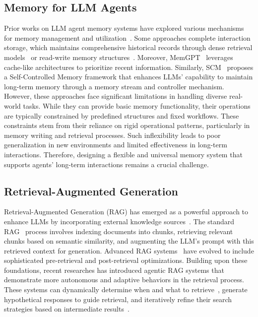 \documentclass{article}
\begin{document}
\subsection{Memory for LLM Agents}
Prior works on LLM agent memory systems have explored various mechanisms for memory management and utilization~\cite{aios,agentlite,mem0,memorybank}. Some approaches complete interaction storage, which maintains comprehensive historical records through dense retrieval models~\cite{memorybank} or read-write memory structures~\cite{modarressi2023ret}. Moreover, MemGPT~\cite{memgpt} leverages cache-like architectures to prioritize recent information. Similarly, SCM~\cite{wang2023enhancing} proposes a Self-Controlled Memory framework that enhances LLMs' capability to maintain long-term memory through a memory stream and controller mechanism.
However, these approaches face significant limitations in handling diverse real-world tasks. While they can provide basic memory functionality, their operations are typically constrained by predefined structures and fixed workflows. These constraints stem from their reliance on rigid operational patterns, particularly in memory writing and retrieval processes. Such inflexibility leads to poor generalization in new environments and limited effectiveness in long-term interactions. Therefore, designing a flexible and universal memory system that supports agents' long-term interactions remains a crucial challenge.


\subsection{Retrieval-Augmented Generation}
Retrieval-Augmented Generation (RAG) has emerged as a powerful approach to enhance LLMs by incorporating external knowledge sources~\cite{rag1,borgeaud2022improving,gao2023retrieval}. The standard RAG~\cite{yu2023chain,wang2023learning} process involves indexing documents into chunks, retrieving relevant chunks based on semantic similarity, and augmenting the LLM's prompt with this retrieved context for generation. Advanced RAG systems~\cite{lin2023ra,ilin2023advanced} have evolved to include sophisticated pre-retrieval and post-retrieval optimizations.
Building upon these foundations, recent researches has introduced agentic RAG systems that demonstrate more autonomous and adaptive behaviors in the retrieval process. These systems can dynamically determine when and what to retrieve~\cite{asai2023self,jiang2023active}, generate hypothetical responses to guide retrieval, and iteratively refine their search strategies based on intermediate results~\cite{trivedi2022interleaving,shao2023enhancing}. 
\end{document}
